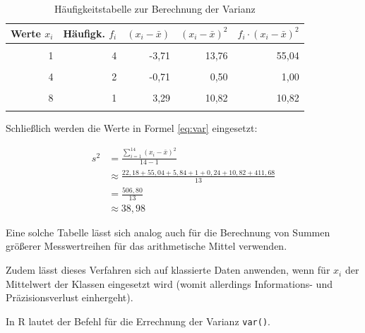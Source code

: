 \documentclass[
  11pt,
  ngerman,
  a4paper,
]{report}
\newenvironment{rtip}{
  \medskip
  \begin{tcolorbox}[colframe=purple,colback=light_gray,title=Softwarehinweis]
}{
  \end{tcolorbox}
  \medskip
}
\begin{document}
\begin{table}

\caption{\label{tab:freq}Häufigkeitstabelle zur Berechnung der Varianz}
\centering
\begin{tabular}[t]{rrrrr}
\toprule
\textbf{Werte $x_i$} & \textbf{Häufigk. $f_i$} & \textbf{$(x_i- \bar{x})$} & \textbf{$(x_i- \bar{x})^2$} & \textbf{$f_i\cdot(x_i -\bar{x})^2$}\\
\midrule
\cellcolor{gray!6}{0} & \cellcolor{gray!6}{1} & \cellcolor{gray!6}{-4,71} & \cellcolor{gray!6}{22,18} & \cellcolor{gray!6}{22,18}\\
1 & 4 & -3,71 & 13,76 & 55,04\\
\cellcolor{gray!6}{3} & \cellcolor{gray!6}{2} & \cellcolor{gray!6}{-1,71} & \cellcolor{gray!6}{2,92} & \cellcolor{gray!6}{5,84}\\
4 & 2 & -0,71 & 0,50 & 1,00\\
\cellcolor{gray!6}{5} & \cellcolor{gray!6}{3} & \cellcolor{gray!6}{0,29} & \cellcolor{gray!6}{0,08} & \cellcolor{gray!6}{0,24}\\
8 & 1 & 3,29 & 10,82 & 10,82\\
\cellcolor{gray!6}{25} & \cellcolor{gray!6}{1} & \cellcolor{gray!6}{20,29} & \cellcolor{gray!6}{411,68} & \cellcolor{gray!6}{411,68}\\
\bottomrule
\end{tabular}
\end{table}

Schließlich werden die Werte in Formel \eqref{eq:var} eingesetzt:

\nopagebreak

\[\begin{aligned}
    s^2&=\frac{\sum\limits_{i=1}^{14}(x_{i}-\bar{x})^2}{14-1} \\[4pt]
       &\approx\frac{22{,}18+55{,}04+5{,}84+1+0{,}24+10{,}82+411{,}68}{13} \\[4pt]
       &=\frac{506{,}80}{13}\\[4pt]
       &\approx 38{,}98
\end{aligned}\]

Eine solche Tabelle lässt sich analog auch für die Berechnung von Summen größerer Messwertreihen für das arithmetische Mittel verwenden.

Zudem lässt dieses Verfahren sich auf klassierte Daten anwenden, wenn für \(x_i\) der Mittelwert der Klassen eingesetzt wird (womit allerdings Informations- und Präzisionsverlust einhergeht).

\begin{rtip}
In R lautet der Befehl für die Errechnung der Varianz \verb|var()|.
\end{rtip}
\end{document}
